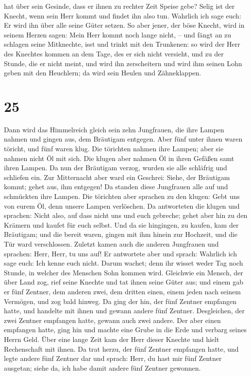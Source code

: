 hat über sein Gesinde, dass er ihnen zu rechter Zeit Speise gebe?
 Selig ist der Knecht, wenn sein Herr kommt und findet
ihn also tun.  Wahrlich ich sage euch: Er wird ihn über
alle seine Güter setzen.  So aber jener, der böse Knecht,
wird in seinem Herzen sagen: Mein Herr kommt noch lange nicht, --
 und fängt an zu schlagen seine Mitknechte, isst und
trinkt mit den Trunkenen:  so wird der Herr des Knechtes
kommen an dem Tage, des er sich nicht versieht, und zu der Stunde, die
er nicht meint,  und wird ihn zerscheitern und wird ihm
seinen Lohn geben mit den Heuchlern; da wird sein Heulen und
Zähneklappen.

\hypertarget{section-24}{%
\section{25}\label{section-24}}

 Dann wird das Himmelreich gleich sein zehn Jungfrauen,
die ihre Lampen nahmen und gingen aus, dem Bräutigam entgegen.
 Aber fünf unter ihnen waren töricht, und fünf waren klug.
 Die törichten nahmen ihre Lampen; aber sie nahmen nicht
Öl mit sich.  Die klugen aber nahmen Öl in ihren Gefäßen
samt ihren Lampen.  Da nun der Bräutigam verzog, wurden
sie alle schläfrig und schliefen ein.  Zur Mitternacht
aber ward ein Geschrei: Siehe, der Bräutigam kommt; gehet aus, ihm
entgegen!  Da standen diese Jungfrauen alle auf und
schmückten ihre Lampen.  Die törichten aber sprachen zu
den klugen: Gebt uns von eurem Öl, denn unsere Lampen verlöschen.
 Da antworteten die klugen und sprachen: Nicht also, auf
dass nicht uns und euch gebreche; gehet aber hin zu den Krämern und
kaufet für euch selbst.  Und da sie hingingen, zu kaufen,
kam der Bräutigam; und die bereit waren, gingen mit ihm hinein zur
Hochzeit, und die Tür ward verschlossen.  Zuletzt kamen
auch die anderen Jungfrauen und sprachen: Herr, Herr, tu uns auf!
 Er antwortete aber und sprach: Wahrlich ich sage euch:
Ich kenne euch nicht.  Darum wachet; denn ihr wisset
weder Tag noch Stunde, in welcher des Menschen Sohn kommen wird.
 Gleichwie ein Mensch, der über Land zog, rief seine
Knechte und tat ihnen seine Güter aus;  und einem gab er
fünf Zentner, dem anderen zwei, dem dritten einen, einem jeden nach
seinem Vermögen, und zog bald hinweg.  Da ging der hin,
der fünf Zentner empfangen hatte, und handelte mit ihnen und gewann
andere fünf Zentner.  Desgleichen, der zwei Zentner
empfangen hatte, gewann auch zwei andere.  Der aber einen
empfangen hatte, ging hin und machte eine Grube in die Erde und verbarg
seines Herrn Geld.  Über eine lange Zeit kam der Herr
dieser Knechte und hielt Rechenschaft mit ihnen.  Da trat
herzu, der fünf Zentner empfangen hatte, und legte andere fünf Zentner
dar und sprach: Herr, du hast mir fünf Zentner ausgetan; siehe da, ich
habe damit andere fünf Zentner gewonnen.

